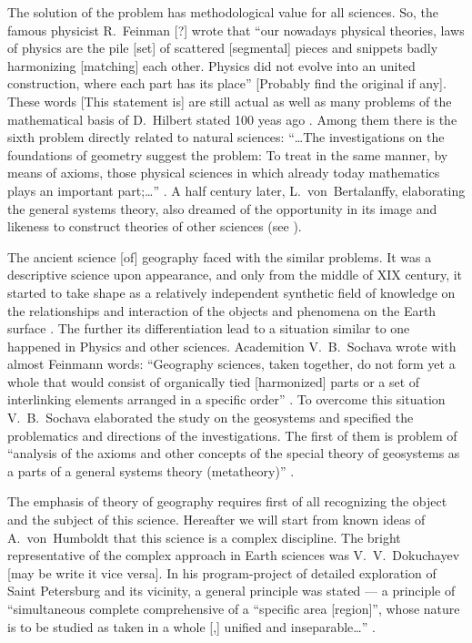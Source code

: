 \documentclass[12pt,leqno]{book}
\begin{document}
The solution of the problem has methodological value for all sciences. So, the famous physicist R.~Feinman [?] \cite{b437} wrote that ``our nowadays physical theories, laws of physics are the pile [set] of scattered [segmental] pieces and snippets badly harmonizing [matching] each other. Physics did not evolve into an united construction, where each part has its place'' [Probably find the original if any]. These words [This statement is] are still actual as well as many problems of the mathematical basis of D.~Hilbert stated 100 yeas ago \cite{b347}. Among them there is the sixth problem directly related to natural sciences: ``\ldots The investigations on the foundations of geometry suggest the problem: To treat in the same manner, by means of axioms, those physical sciences in which already today mathematics plays an important part;\ldots{}'' \cite[p.~34]{b347}. A half century later, L.~von~Bertalanffy, elaborating the general systems theory, also dreamed of the opportunity in its image and likeness to construct theories of other sciences (see \cite{b367}).

The ancient science [of] geography faced with the similar problems. It was a descriptive science upon appearance, and only from the middle of XIX century, it started to take shape as a relatively independent synthetic field of knowledge on the relationships and interaction of the objects and phenomena on the Earth surface \cite{b118,b176}. The further its differentiation lead to a situation similar to one happened in Physics and other sciences. Academition V.~B.~Sochava wrote with almost Feinmann words: ``Geography sciences, taken together, do not form yet a whole that would consist of organically tied [harmonized] parts or a set of interlinking elements arranged in a specific order'' \cite[p.~480]{b397}. To overcome this situation V.~B.~Sochava elaborated the study on the geosystems and specified the problematics and directions of the investigations. The first of them is problem of ``analysis of the axioms and other concepts of the special theory of geosystems as a parts of a general systems theory (metatheory)'' \cite[p.~15]{p397}.

The emphasis of theory of geography requires first of all recognizing the object and the subject of this science. Hereafter we will start from known ideas of A.~von~Humboldt that this science is a complex discipline. The bright representative of the complex approach in Earth sciences was V.~V.~Dokuchayev [may be write it vice versa]. In his program-project of detailed exploration of Saint Petersburg and its vicinity, a general principle was stated --- a principle of ``simultaneous complete comprehensive of a ``specific area [region]'', whose nature is to be studied as taken in a whole [,] unified and inseparable\ldots{}'' \cite[p.~461]{p152}.
\end{document}
